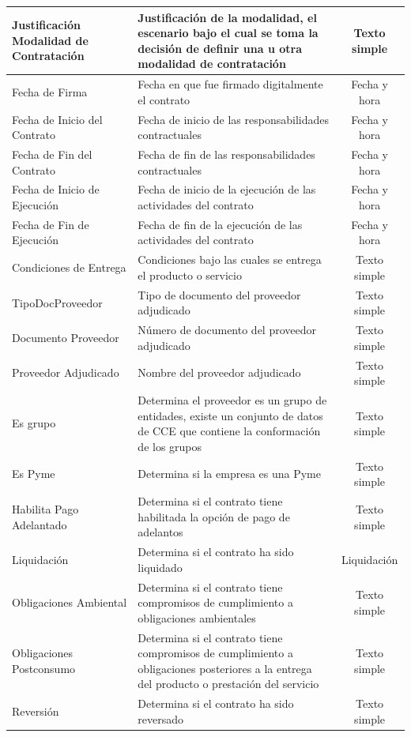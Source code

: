 \documentclass[11pt,letterpaper,oneside]{article}
\begin{document}
\begin{table}[!htp]
\begin{tabular}{|p{3cm}|p{6.5cm}|c|}
		\hline
		Justificación Modalidad de Contratación & Justificación de la modalidad, el escenario bajo el cual se toma la decisión de definir una u otra modalidad de contratación & Texto simple \\
		\hline
		Fecha de Firma & Fecha en que fue firmado digitalmente el contrato & Fecha y hora  \\
		\hline
		Fecha de Inicio del Contrato & Fecha de inicio de las responsabilidades contractuales & Fecha y hora \\
		\hline
		Fecha de Fin del Contrato & Fecha de fin de las responsabilidades contractuales & Fecha y hora \\
		\hline
		Fecha de Inicio de Ejecución & Fecha de inicio de la ejecución de las actividades del contrato & Fecha y hora \\
		\hline
		Fecha de Fin de Ejecución & Fecha de fin de la ejecución de las actividades del contrato & Fecha y hora \\
		\hline
		Condiciones de Entrega & Condiciones bajo las cuales se entrega el producto o servicio & Texto simple \\
		\hline
		TipoDocProveedor & Tipo de documento del proveedor adjudicado & Texto simple \\
		\hline
		Documento Proveedor & Número de documento del proveedor adjudicado & Texto simple \\
		\hline
		Proveedor Adjudicado & Nombre del proveedor adjudicado & Texto simple \\
		\hline
		Es grupo & Determina el proveedor es un grupo de entidades, existe un conjunto de datos de CCE que contiene la conformación de los grupos & Texto simple \\
		\hline
		Es Pyme & Determina si la empresa es una Pyme & Texto simple \\
		\hline
		Habilita Pago Adelantado & Determina si el contrato tiene habilitada la opción de pago de adelantos & Texto simple \\
		\hline
		Liquidación & Determina si el contrato ha sido liquidado & Liquidación \\
		\hline
		Obligaciones Ambiental & 	
		Determina si el contrato tiene compromisos de cumplimiento a obligaciones ambientales & Texto simple \\
		\hline
		Obligaciones Postconsumo & Determina si el contrato tiene compromisos de cumplimiento a obligaciones posteriores a la entrega del producto o prestación del servicio & Texto simple \\
		\hline
		Reversión & Determina si el contrato ha sido reversado & Texto simple \\

\end{tabular}
\end{table}
\end{document}
